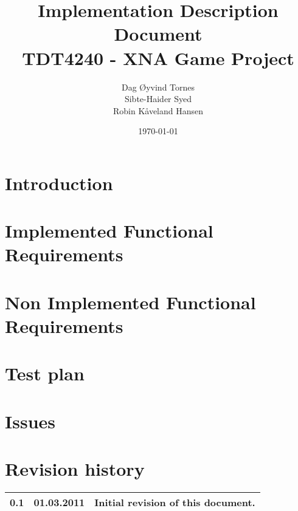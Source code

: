 \documentclass[titlepage,a4paper,11pt]{article}
\date{\today}
\begin{document}
\title{Implementation Description Document\\
 		TDT4240 - XNA Game Project}

\author{Dag Øyvind Tornes\\
 		Sibte-Haider Syed\\ 
		Robin Kåveland Hansen\\}
\maketitle

\pagestyle{empty}
\tableofcontents
\clearpage
\pagestyle{plain}

\section{Introduction}
	
	
\section{Implemented Functional Requirements}
	
	
\section{Non Implemented Functional Requirements}
	

\section{Test plan}
	

%	

%	


\section{Issues}
\section{Revision history}

\begin{table}[H]
  \begin{tabular}{| c | c | c |}
    \hline
    0.1 & 01.03.2011 & Initial revision of this document. \\
    \hline
  \end{tabular}
\end{table}
\end{document}
